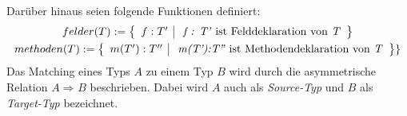 \documentclass[a4paper,12pt]{article}
\newcommand{\matchTyp}[3]
{
#1  
\Rightarrow_{#2}
 #3
}
\begin{document}
Darüber hinaus seien folgende Funktionen definiert:
\begin{gather*}
felder(T) :=  \left\{ 
				\begin{array}{l|l}
					f : T' & \text{ \emph{f : T'} ist Felddeklaration von \emph{T}}
				\end{array}
              \right\}\\
methoden(T) := \left\{ 
				\begin{array}{l|l}
					m(T'):T'' & \text{ \emph{m(T'):T''} ist Methodendeklaration von 										\emph{T}}
				\end{array}
              \right\}\}
\end{gather*}
\noindent
Das Matching eines Typs $A$ zu einem Typ $B$ wird durch die asymmetrische Relation $\matchTyp{A}{}{B}$ beschrieben. Dabei wird $A$ auch als \emph{Source-Typ} und $B$ als \emph{Target-Typ} bezeichnet.
\end{document}
